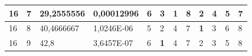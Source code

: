 \documentclass[conference]{IEEEtran}
\begin{document}
\begin{table}[]
\begin{tabular}{|llll|llllllll|}
\multicolumn{1}{|l|}{16}                                                    & \multicolumn{1}{l|}{7}                                                        & \multicolumn{1}{l|}{29,2555556}                                                   & 0,00012996                     & \multicolumn{1}{l|}{6}                                                  & \multicolumn{1}{l|}{3}                                                  & \multicolumn{1}{l|}{\textbf{1}}                                         & \multicolumn{1}{l|}{8}                                                  & \multicolumn{1}{l|}{2}                                                  & \multicolumn{1}{l|}{4}                                                  & \multicolumn{1}{l|}{5}                                                  & 7                          \\ \hline
\multicolumn{1}{|l|}{16}                                                    & \multicolumn{1}{l|}{8}                                                        & \multicolumn{1}{l|}{40,4666667}                                                   & 1,0246E-06                     & \multicolumn{1}{l|}{5}                                                  & \multicolumn{1}{l|}{2}                                                  & \multicolumn{1}{l|}{4}                                                  & \multicolumn{1}{l|}{7}                                                  & \multicolumn{1}{l|}{\textbf{1}}                                         & \multicolumn{1}{l|}{3}                                                  & \multicolumn{1}{l|}{6}                                                  & 8                          \\ \hline
\multicolumn{1}{|l|}{16}                                                    & \multicolumn{1}{l|}{9}                                                        & \multicolumn{1}{l|}{42,8}                                                         & 3,6457E-07                     & \multicolumn{1}{l|}{6}                                                  & \multicolumn{1}{l|}{\textbf{1}}                                         & \multicolumn{1}{l|}{4}                                                  & \multicolumn{1}{l|}{7}                                                  & \multicolumn{1}{l|}{2}                                                  & \multicolumn{1}{l|}{3}                                                  & \multicolumn{1}{l|}{5}                                                  & 8                          \\ \hline

\end{tabular}
\end{table}
\end{document}
